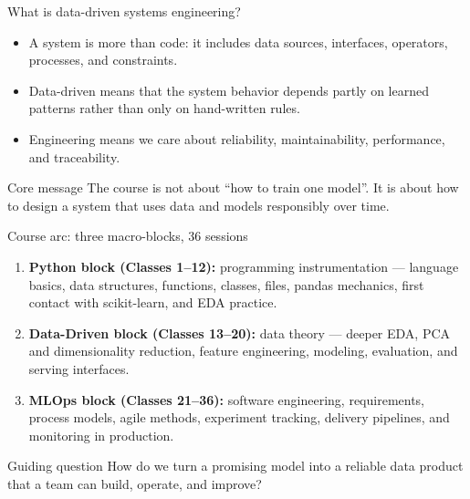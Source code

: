 \begin{frame}{What is data-driven systems engineering?}
\begin{itemize}
\item A system is more than code: it includes data sources, interfaces, operators, processes, and constraints.
\item Data-driven means that the system behavior depends partly on learned patterns rather than only on hand-written rules.
\item Engineering means we care about reliability, maintainability, performance, and traceability.
\end{itemize}
\begin{alertblock}{Core message}
The course is not about ``how to train one model''. It is about how to design a system that uses data and models responsibly over time.
\end{alertblock}
\coursefooter
\end{frame}

\begin{frame}{Course arc: three macro-blocks, 36 sessions}
\begin{enumerate}
\item \textbf{Python block (Classes 1--12):} programming instrumentation --- language basics, data structures, functions, classes, files, pandas mechanics, first contact with scikit-learn, and EDA practice.
\item \textbf{Data-Driven block (Classes 13--20):} data theory --- deeper EDA, PCA and dimensionality reduction, feature engineering, modeling, evaluation, and serving interfaces.
\item \textbf{MLOps block (Classes 21--36):} software engineering, requirements, process models, agile methods, experiment tracking, delivery pipelines, and monitoring in production.
\end{enumerate}
\vspace{0.5em}
\begin{block}{Guiding question}
How do we turn a promising model into a reliable data product that a team can build, operate, and improve?
\end{block}
\coursefooter
\end{frame}

